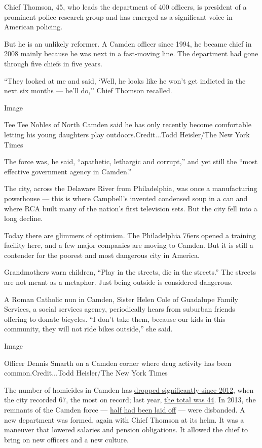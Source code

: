 Chief Thomson, 45, who leads the department of 400 officers, is
president of a prominent police research group and has emerged as a
significant voice in American policing.

But he is an unlikely reformer. A Camden officer since 1994, he became
chief in 2008 mainly because he was next in a fast-moving line. The
department had gone through five chiefs in five years.

``They looked at me and said, `Well, he looks like he won't get indicted
in the next six months --- he'll do,'' Chief Thomson recalled.

Image

Tee Tee Nobles of North Camden said he has only recently become
comfortable letting his young daughters play outdoors.Credit...Todd
Heisler/The New York Times

The force was, he said, ``apathetic, lethargic and corrupt,'' and yet
still the ``most effective government agency in Camden.''

The city, across the Delaware River from Philadelphia, was once a
manufacturing powerhouse --- this is where Campbell's invented condensed
soup in a can and where RCA built many of the nation's first television
sets. But the city fell into a long decline.

Today there are glimmers of optimism. The Philadelphia 76ers opened a
training facility here, and a few major companies are moving to Camden.
But it is still a contender for the poorest and most dangerous city in
America.

Grandmothers warn children, ``Play in the streets, die in the streets.''
The streets are not meant as a metaphor. Just being outside is
considered dangerous.

A Roman Catholic nun in Camden, Sister Helen Cole of Guadalupe Family
Services, a social services agency, periodically hears from suburban
friends offering to donate bicycles. ``I don't take them, because our
kids in this community, they will not ride bikes outside,'' she said.

Image

Officer Dennis Smarth on a Camden corner where drug activity has been
common.Credit...Todd Heisler/The New York Times

The number of homicides in Camden has
\href{https://www.nytimes3xbfgragh.onion/2014/09/01/nyregion/camden-turns-around-with-new-police-force.html}{dropped
significantly since 2012}, when the city recorded 67, the most on
record; last year,
\href{http://www.nj.com/camden/index.ssf/2017/01/camden_4th_most_dangerous_us_city_real_estate_comp.html}{the
total was 44}. In 2013, the remnants of the Camden force ---
\href{http://www.nytimes3xbfgragh.onion/2011/03/07/nyregion/07camden.html}{half
had been laid off} --- were disbanded. A new department was formed,
again with Chief Thomson at its helm. It was a maneuver that lowered
salaries and pension obligations. It allowed the chief to bring on new
officers and a new culture.


